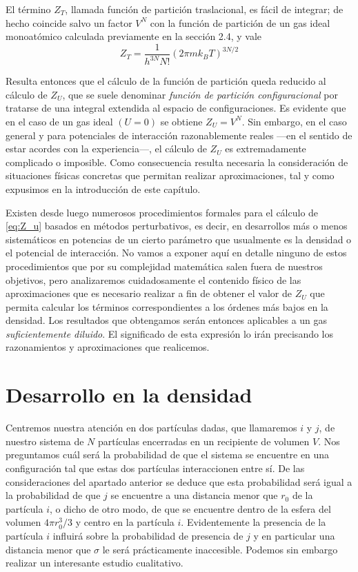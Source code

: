El término $Z_T$, llamada función de partición traslacional, es fácil de integrar; de hecho coincide salvo un factor $V^N$ con la función de partición de un gas ideal monoatómico calculada previamente en la sección 2.4, y vale
\begin{equation}\label{eq:Z_t}
	Z_T = \frac{1}{h^{3N} N!} (2\pi m k_B T)^{3N/2}
\end{equation}

Resulta entonces que el cálculo de la función de partición queda reducido al cálculo de $Z_U$, que se suele denominar \emph{función de partición configuracional} por tratarse de una integral extendida al espacio de configuraciones. Es evidente que en el caso de un gas ideal $(U = 0)$ se obtiene $Z_U = V^N$.
Sin embargo, en el caso general y para potenciales de interacción razonablemente reales ---en el sentido de estar acordes con la experiencia---, el cálculo de $Z_U$ es extremadamente complicado o imposible.
Como consecuencia resulta necesaria la consideración de situaciones físicas concretas que permitan realizar aproximaciones, tal y como expusimos en la introducción de este capítulo.

Existen desde luego numerosos procedimientos formales para el cálculo de \eqref{eq:Z_u} basados en métodos perturbativos, es decir, en desarrollos más o menos sistemáticos en potencias de un cierto parámetro que usualmente es la densidad o el potencial de interacción.
No vamos a exponer aquí en detalle ninguno de estos procedimientos que por su complejidad matemática salen fuera de nuestros objetivos, pero analizaremos cuidadosamente el contenido físico de las aproximaciones que es necesario realizar a fin de obtener el valor de $Z_U$ que permita calcular los términos correspondientes a los órdenes más bajos en la densidad.
Los resultados que obtengamos serán entonces aplicables a un gas \emph{suficientemente diluido}.
El significado de esta expresión lo irán precisando los razonamientos y aproximaciones que realicemos.

\section{Desarrollo en la densidad}

Centremos nuestra atención en dos partículas dadas, que llamaremos $i$ y $j$, de nuestro sistema de $N$ partículas encerradas en un recipiente de volumen $V$.
Nos preguntamos cuál será la probabilidad de que el sistema se encuentre en una configuración tal que estas dos partículas interaccionen entre sí. De las consideraciones del apartado anterior se deduce que esta probabilidad será igual a la probabilidad de que $j$ se encuentre a una distancia menor que $r_0$ de la partícula $i$, o dicho de otro modo, de que se encuentre dentro de la esfera del volumen $4\pi r_0^3/3$ y centro en la partícula $i$.
Evidentemente la presencia de la partícula $i$ influirá sobre la probabilidad de presencia de $j$ y en particular una distancia menor que $\sigma$ le será prácticamente inaccesible.
Podemos sin embargo realizar un interesante estudio cualitativo.

